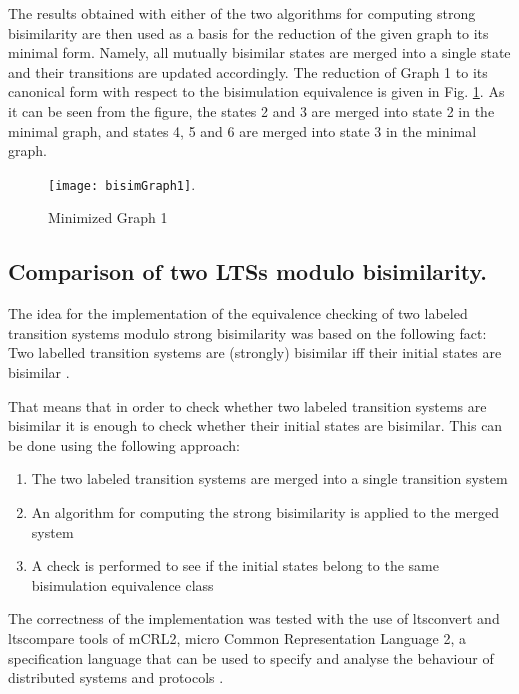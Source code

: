 The results obtained with either of the two algorithms for computing strong bisimilarity are then used as a basis for the reduction of the given graph to its minimal form. Namely, all mutually bisimilar states are merged into a single state and their transitions are updated accordingly. The reduction of Graph 1 to its canonical form with respect to the bisimulation equivalence is given in Fig.  \ref{fig:bisimGraph1}. As it can be seen from the figure, the states 2 and 3 are merged into state 2 in the minimal graph, and states 4, 5 and 6 are merged into state 3 in the minimal graph.

\begin{figure}[!ht]
\centering
\texttt{[image: bisimGraph1]}.
\caption{Minimized Graph 1}
\label{fig:bisimGraph1}
\end{figure}

\subsection{Comparison of two LTSs modulo bisimilarity.}
The idea for the implementation of the equivalence checking of two labeled transition systems modulo strong bisimilarity was based on the following fact: Two labelled transition systems are (strongly) bisimilar iff their initial states are bisimilar \cite{ModellingAndAnalysis}.

That means that in order to check whether two labeled transition systems are bisimilar it is enough to check whether their initial states are bisimilar. This can be done using the following approach:
\begin{enumerate}
	\item The two labeled transition systems are merged into a single transition system
	\item An algorithm for computing the strong bisimilarity is applied to the merged system
	\item A check is performed to see if the initial states belong to the same bisimulation equivalence class
\end{enumerate}

The correctness of the implementation was tested with the use of ltsconvert and ltscompare tools of mCRL2, micro Common Representation Language 2, a specification language that can be used to specify and analyse the behaviour of distributed systems and protocols
\cite{mCRL2Ref}.
